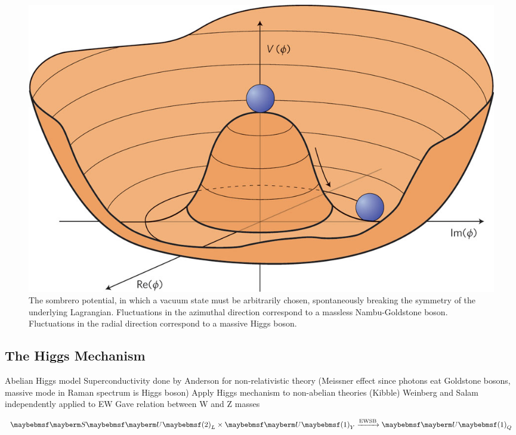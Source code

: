 \begin{figure}
	\includegraphics[width=\mediumfigwidth]{tex/motivation/sombrero}
	\caption{The sombrero potential, in which a vacuum state must be arbitrarily chosen, 
	spontaneously breaking the symmetry of the underlying Lagrangian.
	Fluctuations in the azimuthal direction correspond to a massless Nambu-Goldstone 
	boson. Fluctuations in the radial direction correspond to a massive Higgs boson.}
	\label{fig:sombrero}
\end{figure}

\subsection{The Higgs Mechanism}
\label{sec:ewsb:higgs}
Abelian Higgs model
Superconductivity done by Anderson for non-relativistic theory (Meissner effect since photons eat Goldstone bosons, massive mode in Raman spectrum is Higgs boson)
Apply Higgs mechanism to non-abelian theories (Kibble)
Weinberg and Salam independently applied to EW
Gave relation between W and Z masses

\begin{equation*}
\SUgroup{2}_{L} \times \Ugroup{1}_{Y} \xrightarrow{\text{EWSB}} \Ugroup{1}_{Q}
\end{equation*}
